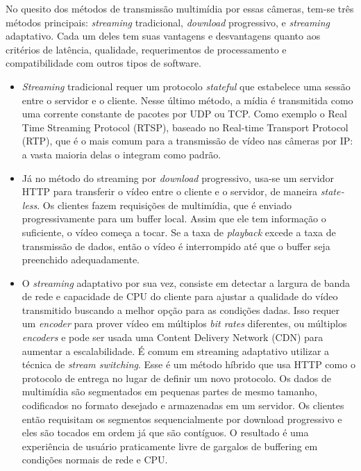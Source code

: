 \documentclass[12pt, %
openright, 
oneside, %
a4paper,    %
brazil]{facom-ufu-abntex2}
\begin{document}
No quesito dos métodos de transmissão multimídia por essas câmeras, tem-se três
métodos principais: \textit{\foreignlanguage{english}{streaming}} tradicional,
\textit{\foreignlanguage{english}{download}} progressivo, e
\textit{\foreignlanguage{english}{streaming}} adaptativo. Cada um deles tem
suas vantagens e desvantagens quanto aos critérios de latência, qualidade,
requerimentos de processamento e compatibilidade com outros tipos de software.
\begin{itemize}
	\item \textit{\foreignlanguage{english}{Streaming}} tradicional requer
	      um protocolo \textit{\foreignlanguage{english}{stateful}} que
	      estabelece uma sessão entre o servidor e o cliente. Nesse último método, a
	      mídia é transmitida como uma corrente constante de pacotes por UDP ou TCP. Como
	      exemplo o Real Time Streaming Protocol (RTSP), baseado no Real-time Transport
	      Protocol (RTP), que é o mais comum para a transmissão de vídeo nas câmeras por
	      IP: a vasta maioria delas o integram como padrão.
	\item Já no método do streaming por
	      \textit{\foreignlanguage{english}{download}} progressivo, usa-se um servidor
	      HTTP para transferir o vídeo entre o cliente e o servidor, de maneira
	      \textit{\foreignlanguage{english}{stateless}}. Os clientes fazem requisições de
	      multimídia, que é enviado progressivamente para um buffer local. Assim que ele
	      tem informação o suficiente, o vídeo começa a tocar. Se a taxa de
	      \textit{\foreignlanguage{english}{playback}} excede a taxa de transmissão de
	      dados, então o vídeo é interrompido até que o buffer seja preenchido
	      adequadamente.
	\item O \textit{\foreignlanguage{english}{streaming}} adaptativo por
	      sua vez, consiste em detectar a largura de banda de rede e capacidade de CPU do
	      cliente para ajustar a qualidade do vídeo transmitido buscando a melhor opção
	      para as condições dadas. Isso requer um
	      \textit{\foreignlanguage{english}{encoder}} para prover vídeo em múltiplos
	      \textit{\foreignlanguage{english}{bit rates}} diferentes, ou múltiplos
	      \textit{\foreignlanguage{english}{encoders}} e pode ser usada uma Content
	      Delivery Network (CDN) para aumentar a escalabilidade. É comum em streaming
	      adaptativo utilizar a técnica de \textit{\foreignlanguage{english}{stream
			      switching}}. Esse é um método híbrido que usa HTTP como o protocolo de entrega
	      no lugar de definir um novo protocolo. Os dados de multimídia são segmentados
	      em pequenas partes de mesmo tamanho, codificados no formato desejado e
	      armazenadas em um servidor. Os clientes então requisitam os segmentos
	      sequencialmente por download progressivo e eles são tocados em ordem já que são
	      contíguos. O resultado é uma experiência de usuário praticamente livre de
	      gargalos de buffering em condições normais de rede e CPU.
\end{itemize}
\end{document}
